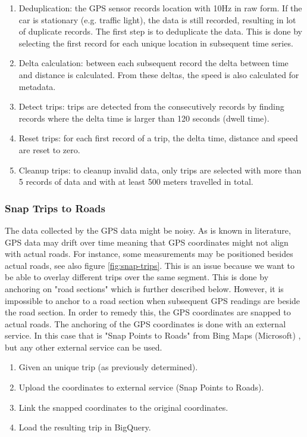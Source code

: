 \begin{enumerate}
\item Deduplication: the GPS sensor records location with 10Hz in raw form. If the car is stationary (e.g. traffic light), the data is still recorded, resulting in lot of duplicate records. The first step is to deduplicate the data. This is done by selecting the first record for each unique location in subsequent time series. 
\item Delta calculation: between each subsequent record the delta between time and distance is calculated. From these deltas, the speed is also calculated for metadata.
\item Detect trips: trips are detected from the consecutively records by finding records where the delta time is larger than 120 seconds (dwell time).
\item Reset trips: for each first record of a trip, the delta time, distance and speed are reset to zero. 
\item Cleanup trips: to cleanup invalid data, only trips are selected with more than 5 records of data and with at least 500 meters travelled in total.
\end{enumerate}


\subsubsection{Snap Trips to Roads}
The data collected by the GPS data might be noisy. As is known in literature, GPS data may drift over time meaning that GPS coordinates might not align with actual roads. For instance, some measurements may be positioned besides actual roads, see also figure \ref{fig:snap-trips}. This is an issue because we want to be able to overlay different trips over the same segment. This is done by anchoring on "road sections" which is further described below. However, it is impossible to anchor to a road section when subsequent GPS readings are beside the road section. In order to remedy this, the GPS coordinates are snapped to actual roads. The anchoring of the GPS coordinates is done with an external service. In this case that is "Snap Points to Roads" from Bing Maps (Microsoft) \cite{Snap-Points-to-Roads}, but any other external service can be used.
\begin{enumerate}
\item Given an unique trip (as previously determined).
\item Upload the coordinates to external service (Snap Points to Roads).
\item Link the snapped coordinates to the original coordinates.
\item Load the resulting trip in BigQuery.
\end{enumerate}

